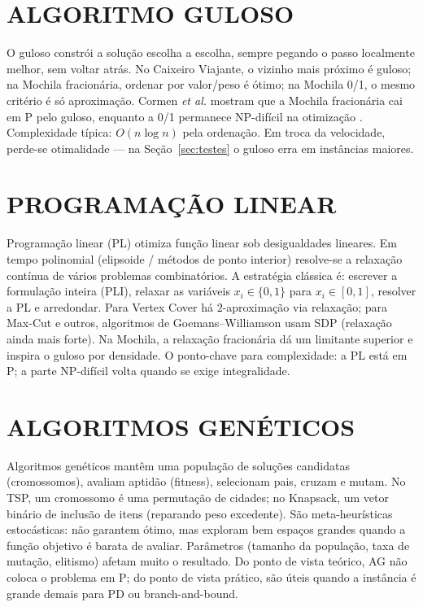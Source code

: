 \documentclass[
    12pt,
    oneside,
    a4paper,
    chapter=TITLE,
    section=TITLE,
    sumario=abnt-6027-2012
]{abntex2}
\begin{document}
\section{ALGORITMO GULOSO}
\label{sec:guloso}

O guloso constrói a solução escolha a escolha, sempre pegando o passo localmente melhor, sem voltar atrás. No Caixeiro Viajante, o vizinho mais próximo é guloso; na Mochila fracionária, ordenar por valor/peso é ótimo; na Mochila 0/1, o mesmo critério é só aproximação. Cormen \textit{et al.} mostram que a Mochila fracionária cai em P pelo guloso, enquanto a 0/1 permanece NP-difícil na otimização \cite{cormen}. Complexidade típica: $O(n \log n)$ pela ordenação. Em troca da velocidade, perde-se otimalidade --- na Seção~\ref{sec:testes} o guloso erra em instâncias maiores.

\section{PROGRAMAÇÃO LINEAR}
\label{sec:pl}

Programação linear (PL) otimiza função linear sob desigualdades lineares. Em tempo polinomial (elipsoide / métodos de ponto interior) resolve-se a relaxação contínua de vários problemas combinatórios. A estratégia clássica é: escrever a formulação inteira (PLI), relaxar as variáveis $x_i \in \{0,1\}$ para $x_i \in [0,1]$, resolver a PL e arredondar. Para Vertex Cover há $2$-aproximação via relaxação; para Max-Cut e outros, algoritmos de Goemans--Williamson usam SDP (relaxação ainda mais forte). Na Mochila, a relaxação fracionária dá um limitante superior e inspira o guloso por densidade. O ponto-chave para complexidade: a PL está em P; a parte NP-difícil volta quando se exige integralidade.

\section{ALGORITMOS GENÉTICOS}
\label{sec:ag}

Algoritmos genéticos mantêm uma população de soluções candidatas (cromossomos), avaliam aptidão (fitness), selecionam pais, cruzam e mutam. No TSP, um cromossomo é uma permutação de cidades; no Knapsack, um vetor binário de inclusão de itens (reparando peso excedente). São meta-heurísticas estocásticas: não garantem ótimo, mas exploram bem espaços grandes quando a função objetivo é barata de avaliar. Parâmetros (tamanho da população, taxa de mutação, elitismo) afetam muito o resultado. Do ponto de vista teórico, AG não coloca o problema em P; do ponto de vista prático, são úteis quando a instância é grande demais para PD ou branch-and-bound.
\end{document}
